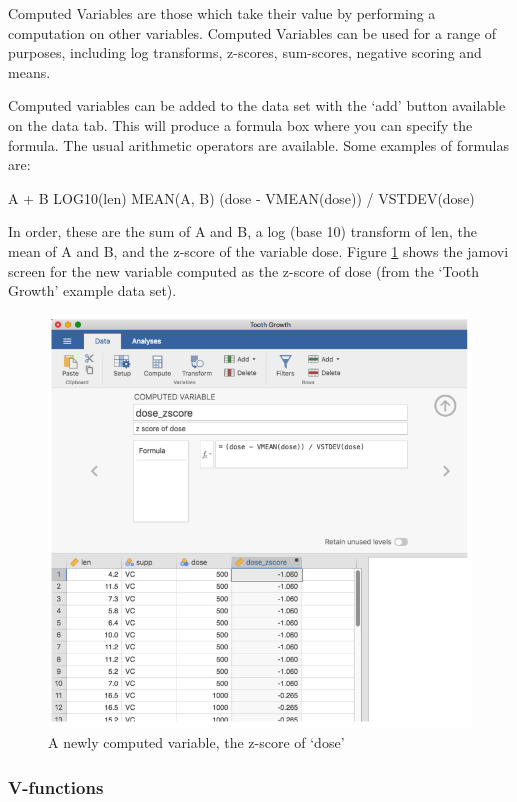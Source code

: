 \documentclass[
]{book}
\begin{document}
Computed Variables are those which take their value by performing a computation on other variables. Computed Variables can be used for a range of purposes, including log transforms, z-scores, sum-scores, negative scoring and means.

Computed variables can be added to the data set with the `add' button available on the data tab. This will produce a formula box where you can specify the formula. The usual arithmetic operators are available. Some examples of formulas are:

A + B LOG10(len) MEAN(A, B) (dose - VMEAN(dose)) / VSTDEV(dose)

In order, these are the sum of A and B, a log (base 10) transform of len, the mean of A and B, and the z-score of the variable dose. Figure \ref{fig:fig3-3} shows the jamovi screen for the new variable computed as the z-score of dose (from the `Tooth Growth' example data set).

\begin{figure}
\includegraphics[width=0.9\linewidth]{images/Figure4} \caption{A newly computed variable, the z-score of ‘dose’}\label{fig:fig3-3}
\end{figure}

\hypertarget{v-functions}{%
\subsubsection{V-functions}\label{v-functions}}
\end{document}
